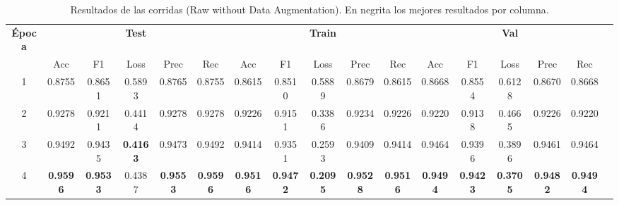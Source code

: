 \documentclass[conference]{IEEEtran}
\begin{document}
\begin{table}[h]
\scriptsize
\caption{Resultados de las corridas (Raw without Data Augmentation). En negrita los mejores resultados por columna.}
\centering
\begin{tabular}{|c|c|c|c|c|c|c|c|c|c|c|c|c|c|c|c|c|}
\hline
\textbf{Época} & \multicolumn{5}{c|}{\textbf{Test}} & \multicolumn{5}{c|}{\textbf{Train}} & \multicolumn{5}{c|}{\textbf{Val}} \\
\cline{2-16}
 & Acc & F1 & Loss & Prec & Rec & Acc & F1 & Loss & Prec & Rec & Acc & F1 & Loss & Prec & Rec \\
\hline
1 & 0.8755 & 0.8651 & 0.5893 & 0.8765 & 0.8755 & 0.8615 & 0.8510 & 0.5889 & 0.8679 & 0.8615 & 0.8668 & 0.8554 & 0.6128 & 0.8670 & 0.8668 \\
2 & 0.9278 & 0.9211 & 0.4414 & 0.9278 & 0.9278 & 0.9226 & 0.9151 & 0.3386 & 0.9234 & 0.9226 & 0.9220 & 0.9138 & 0.4665 & 0.9226 & 0.9220 \\
3 & 0.9492 & 0.9435 & \textbf{0.4163} & 0.9473 & 0.9492 & 0.9414 & 0.9351 & 0.2593 & 0.9409 & 0.9414 & 0.9464 & 0.9396 & 0.3896 & 0.9461 & 0.9464 \\
4 & \textbf{0.9596} & \textbf{0.9533} & 0.4387 & \textbf{0.9553} & \textbf{0.9596} & \textbf{0.9516} & \textbf{0.9472} & \textbf{0.2095} & \textbf{0.9528} & \textbf{0.9516} & \textbf{0.9494} & \textbf{0.9423} & \textbf{0.3705} & \textbf{0.9482} & \textbf{0.9494} \\
\hline
\end{tabular}
\label{tab:raw_noaug_results}
\end{table}
\end{document}
